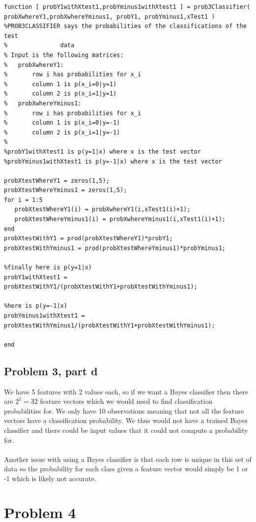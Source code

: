 \documentclass[11pt,psfig]{article}
\begin{document}
\begin{verbatim}
function [ probY1withXtest1,probYminus1withXtest1 ] = prob3Classifier( 
probXwhereY1,probXwhereYminus1, probY1, probYminus1,xTest1 )
%PROB3CLASSIFIER says the probabilities of the classifications of the test
%               data
% Input is the following matrices:
%   probXwhereY1:
%       row i has probabilities for x_i
%       column 1 is p(x_i=0|y=1)
%       column 2 is p(x_i=1|y=1)
%   probXwhereYminus1:
%       row i has probabilities for x_i
%       column 1 is p(x_i=0|y=-1)
%       column 2 is p(x_i=1|y=-1)
%
%probY1withXtest1 is p(y=1|x) where x is the test vector
%probYminus1withXtest1 is p(y=-1|x) where x is the test vector

probXtestWhereY1 = zeros(1,5);
probXtestWhereYminus1 = zeros(1,5);
for i = 1:5
   probXtestWhereY1(i) = probXwhereY1(i,xTest1(i)+1); 
   probXtestWhereYminus1(i) = probXwhereYminus1(i,xTest1(i)+1); 
end
probXtestWithY1 = prod(probXtestWhereY1)*probY1;
probXtestWithYminus1 = prod(probXtestWhereYminus1)*probYminus1;

%finally here is p(y=1|x)
probY1withXtest1 = probXtestWithY1/(probXtestWithY1+probXtestWithYminus1);

%here is p(y=-1|x)
probYminus1withXtest1 = probXtestWithYminus1/(probXtestWithY1+probXtestWithYminus1);

end
\end{verbatim}

\newpage

\subsection*{Problem 3, part d}

We have 5 features with 2 values each, so if we want a Bayes classifier then there are $2^5=32$ feature vectors which we would need to find classification probabilities for. We only have 10 observations meaning that not all the feature vectors have a classification probability. We thus would not have a trained Bayes classifier and there could be input values that it could not compute a probability for.\\
\\
Another issue with using a Bayes classifier is that each row is unique in this set of data so the probability for each class given a feature vector would simply be 1 or -1 which is likely not accurate.

\newpage

\section*{Problem 4}
\end{document}

